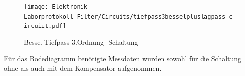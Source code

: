 \begin{figure}[H]
 \centering
 \texttt{[image: Elektronik-Laborprotokoll\_Filter/Circuits/tiefpass3besselpluslagpass\_circuiıt.pdf]}
 \caption{ Bessel-Tiefpass 3.Ordnung -Schaltung}
 \label{fig:Bessel_Tiefpass_3.Ordnung_Kompensiert}
\end{figure}

Für das Bodediagramm benötigte Messdaten wurden sowohl für die Schaltung ohne als auch mit dem Kompensator aufgenommen.










%
%
%
%
%
%
%





%




